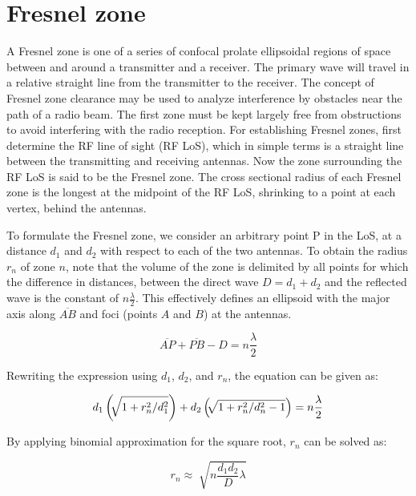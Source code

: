 \documentclass[a4paper,12pt]{report}
\begin{document}
\section{Fresnel zone}

A Fresnel zone is one of a series of confocal prolate ellipsoidal regions
of space between and around a transmitter and a receiver.
The primary wave will travel in a relative straight line from the transmitter to the receiver.
The concept of Fresnel zone clearance may be used to analyze
interference by obstacles near the path of a radio beam.
The first zone must be kept largely free from obstructions to
avoid interfering with the radio reception.
For establishing Fresnel zones, first determine the RF line of sight
(RF LoS), which in simple terms is a straight line
between the transmitting and receiving antennas.
Now the zone surrounding the RF LoS is said to be the Fresnel zone.
The cross sectional radius of each Fresnel zone is the longest
at the midpoint of the RF LoS,
shrinking to a point at each vertex, behind the antennas.

To formulate the Fresnel zone,
we consider an arbitrary point P in the LoS, at a distance $d_1$ and $d_2$
with respect to each of the two antennas.
To obtain the radius $r_n$ of zone $n$,
note that the volume of the zone is delimited by all points
for which the difference in distances,
between the direct wave $D = d_1 + d_2$ and the reflected wave
is the constant of $n\frac{\lambda}{2}$.
This effectively defines an ellipsoid with the major axis along $\overline{AB}$
and foci (points $A$ and $B$) at the antennas.

\begin{equation}
  \overline{AP} + \overline{PB} - D = n\frac{\lambda}{2}
\end{equation}

Rewriting the expression using $d_1$, $d_2$, and $r_n$,
the equation can be given as:

\begin{equation}
  d_1\left(\sqrt[]{1 + r_n^2/d_1^2}\right) + \\
  d_2\left(\sqrt[]{1 + r_n^2/d_n^2 - 1}\right) = n\frac{\lambda}{2}
\end{equation}

By applying binomial approximation for the square root,
$r_n$ can be solved as:

\begin{equation}
  r_n \approx \sqrt[]{n\frac{d_1 d_2}{D}\lambda}
\end{equation}
\end{document}
